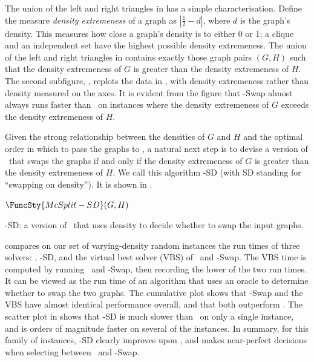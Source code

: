 The union of the left and right triangles in
 has a simple characterisation.
Define the measure \emph{density extremeness} of
a graph as $\left|\frac{1}{2} - d\right|$, where $d$ is the graph's
density.  This measures how close a graph's
density is to either 0 or 1; a clique and an independent set
have the highest possible density extremeness.  The union of the left and right triangles
in  contains exactly those
graph pairs $(G,H)$ such that the density extremeness of $G$ is greater than
the density extremeness of $H$.
The second subfigure, ,
replots the data in ,
with density extremeness rather than density measured on the axes.
It is evident from the figure that \McSplit-Swap almost always
runs faster than \McSplit\ on instances where the density extremeness of $G$
exceeds the density extremeness of $H$.

Given the strong relationship between the densities of $G$ and $H$ and the 
optimal order in which to pass the graphs to \McSplit, a natural next
step is to devise a version of \McSplit\ that swaps the graphs
if and only if the density extremeness of $G$ is greater
than the density extremeness of $H$.  We call this algorithm
\McSplit-SD (with SD standing for ``swapping on density''). It is shown in .

\begin{algorithm}[h!]
\DontPrintSemicolon
\nl $\FuncSty{McSplit-SD}(G, H)$ \label{McSplitSDFun} \;
\nl {}
    \caption{\McSplit-SD: a version of \McSplit\ that uses density to decide whether to swap the input graphs.} 
\label{McSplitSDAlg}
\end{algorithm}

 compares on our set of varying-density random instances
the run times of three solvers: \McSplit, \McSplit-SD, and the virtual best solver (VBS) of
\McSplit\ and \McSplit-Swap. The VBS time is computed by running \McSplit\ and
\McSplit-Swap, then recording the lower of the two run times.  It can be viewed as the run time
of an algorithm that uses an oracle to determine whether to swap the two graphs.
The cumulative plot shows that \McSplit-Swap and the VBS
have almost identical performance overall, and that both outperform \McSplit.  The scatter
plot in  shows that \McSplit-SD is much slower than
\McSplit\ on only a single instance, and is orders of magnitude faster on several of the
instances.  In summary, for this family of instances, \McSplit-SD clearly improves upon
\McSplit, and makes near-perfect decisions when selecting between \McSplit\ and \McSplit-Swap.

